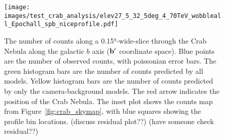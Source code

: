   \begin{figure}[!t]
    \centering
    \texttt{[image: images/test\_crab\_analysis/elev27\_5\_32\_5deg\_4\_70TeV\_wobbleall\_Epochall\_spb\_niceprofile.pdf]}
    \caption[Crab Nebula Profile along Galactic $b$]
    {
      The number of counts along a \ang{0.15}-wide-slice through the Crab Nebula along the galactic $b$ axis ($\mathbf{b'}$ coordinate space).
      Blue points are the number of observed counts, with poissonian error bars.
      The green histogram bars are the number of counts predicted by all models.
      Yellow histogram bars are the number of counts predicted by only the camera-background models.
      The red arrow indicates the position of the Crab Nebula.
      The inset plot shows the counts map from Figure~\ref{fig:crab_skymap}, with blue squares showing the profile bin locations.
      {\color{red}(discuss residual plot??)}
      {\color{red}(have someone check residual??)}
    }
    \label{fig:crab_profile_b}
  \end{figure}
    
